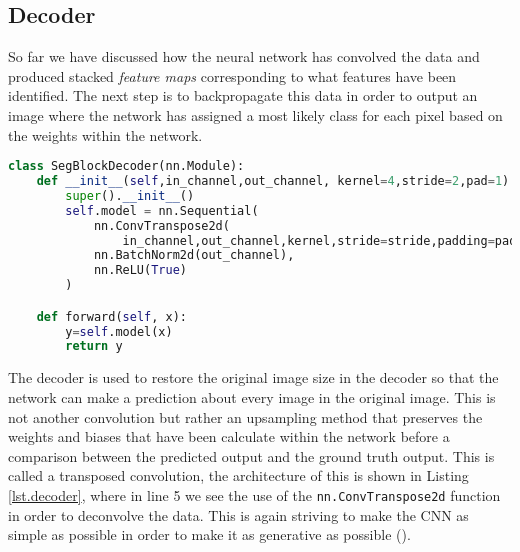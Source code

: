 \subsection{Decoder}
So far we have discussed how the neural network has convolved the data and produced stacked \textit{feature maps} corresponding to what features have been identified. The next step is to backpropagate this data in order to output an image where the network has assigned a most likely class for each pixel based on the weights within the network. 
\begin{lstlisting}[language=Python, caption = {Decoder architecture, works in the opposite way to the Encoder to transpose so that dimensions match that of the ground truth for comparison.}, label={lst.decoder},float,floatplacement=htbp]
class SegBlockDecoder(nn.Module):
    def __init__(self,in_channel,out_channel, kernel=4,stride=2,pad=1):
        super().__init__()
        self.model = nn.Sequential(
            nn.ConvTranspose2d(
                in_channel,out_channel,kernel,stride=stride,padding=pad,bias=False),
            nn.BatchNorm2d(out_channel),
            nn.ReLU(True)
        )

    def forward(self, x):
        y=self.model(x)
        return y
\end{lstlisting}
The decoder is used to restore the original image size in the decoder so that the network can make a prediction about every image in the original image. This is not another convolution but rather an upsampling method that preserves the weights and biases that have been calculate within the network before a comparison between the predicted output and the ground truth output. This is called a transposed convolution, the architecture of this is shown in Listing \ref{lst.decoder}, where in line 5 we see the use of the \texttt{nn.ConvTranspose2d} function in order to deconvolve the data. This is again striving to make the CNN as simple as possible in order to make it as generative as possible (\cite{Springenberg14}).

